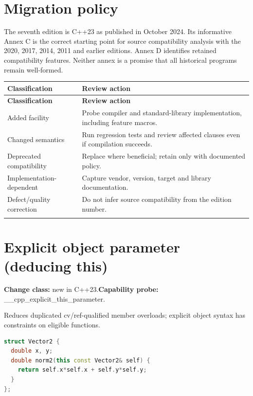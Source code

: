 \documentclass[11pt]{article}
\begin{document}
\docfront
\section{Migration policy}
The seventh edition is C++23 as published in October 2024. Its informative Annex C is the correct starting point for source compatibility analysis with the 2020, 2017, 2014, 2011 and earlier editions. Annex D identifies retained compatibility features. Neither annex is a promise that all historical programs remain well-formed.

\small
\begin{longtable}{@{}p{.25\linewidth}p{.69\linewidth}@{}}
\toprule
\textbf{Classification} & \textbf{Review action}\\
\midrule
\endfirsthead
\toprule
\textbf{Classification} & \textbf{Review action}\\
\midrule
\endhead
Added facility & Probe compiler and standard-library implementation, including feature macros.\\
\addlinespace[2pt]
Changed semantics & Run regression tests and review affected clauses even if compilation succeeds.\\
\addlinespace[2pt]
Deprecated compatibility & Replace where beneficial; retain only with documented policy.\\
\addlinespace[2pt]
Implementation-dependent & Capture vendor, version, target and library documentation.\\
\addlinespace[2pt]
Defect/quality correction & Do not infer source compatibility from the edition number.\\
\addlinespace[2pt]
\bottomrule
\end{longtable}
\normalsize
\section{Explicit object parameter (deducing this)}
\textbf{Change class:} new in C++23.\quad \textbf{Capability probe:} \_\_cpp\_explicit\_this\_parameter.

Reduces duplicated cv/ref-qualified member overloads; explicit object syntax has constraints on eligible functions.

\begin{lstlisting}[language=C++]
struct Vector2 {
  double x, y;
  double norm2(this const Vector2& self) {
    return self.x*self.x + self.y*self.y;
  }
};
\end{lstlisting}
\end{document}
